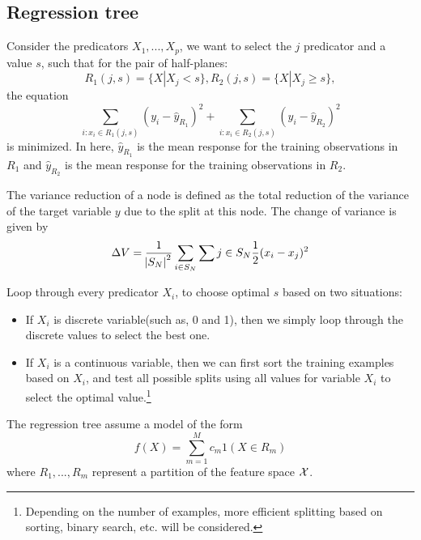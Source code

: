 \begin{refsection}
\subsection{Regression tree}

\begin{definition}
Consider the predicators $X_1,...,X_p$, we want to select the $j$ predicator and a value $s$, such that for the pair of half-planes:
$$R_1(j,s) = \{X|X_j < s\}, R_2(j,s) = \{X|X_j \geq s\},$$
the equation
$$\sum_{i:x_i\in R_1(j,s)} (y_i - \hat{y}_{R_1})^2 + \sum_{i:x_i\in R_2(j,s)} (y_i - \hat{y}_{R_2})^2$$
is minimized. In here, $\hat{y}_{R_1}$ is the mean response for the training observations in $R_1$ and $\hat{y}_{R_2}$ is the mean response for the training observations in $R_2$.
\end{definition}


\begin{remark}
The variance reduction of a node is defined as the total reduction of the variance of the target variable $y$ due to the split at this node. The change of variance is given by
\begin{align*}
\Delta V = \frac{1}{\abs{S_N}^2} \sum_{i \in S_N}\sum{j\in S_N}\frac{1}{2}(x_i-x_j)^2
\end{align*}	
	
\end{remark}


\begin{remark}
Loop through every predicator $X_i$, to choose optimal $s$ based on two situations:
\begin{itemize}
	\item If $X_i$ is discrete variable(such as, 0 and 1), then we simply loop through the discrete values to select the best one.
	\item If $X_i$ is a continuous variable, then we can first sort the training examples based on $X_i$, and test all possible splits using all values for variable $X_i$ to select the optimal value.\footnote{Depending on the number of examples, more efficient splitting based on sorting, binary search, etc. will be considered.}
\end{itemize}	
\end{remark}



The regression tree assume a model of the form
$$f(X) = \sum_{m=1}^M c_m 1(X\in R_m)$$
where $R_1,...,R_m$ represent a partition of the feature space $\mathcal{X}$.




\end{refsection}
